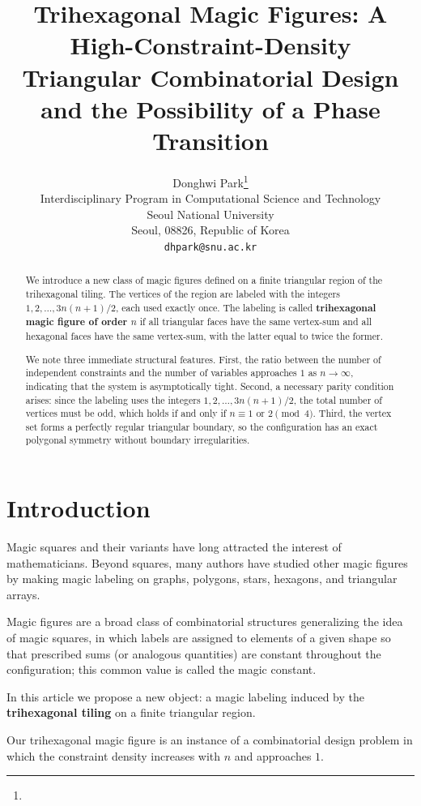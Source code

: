 \documentclass[11pt]{article}
\title{\bfseries Trihexagonal Magic Figures: A High-Constraint-Density Triangular Combinatorial Design and the Possibility of a Phase Transition}
\author{
  Donghwi Park\thanks{}\\
  Interdisciplinary Program in Computational Science and Technology\\
  Seoul National University\\
  Seoul, 08826, Republic of Korea\\
  \texttt{dhpark@snu.ac.kr}
}
\date{} %
\theoremstyle{plain}
\theoremstyle{definition}
\begin{document}
\maketitle

\begin{abstract}
We introduce a new class of magic figures defined on a finite triangular region of the trihexagonal tiling. The vertices of the region are labeled with the integers $1,2,\dots,3n(n+1)/2$, each used exactly once. The labeling is called \textbf{trihexagonal magic figure of order $n$} if all triangular faces have the same vertex-sum and all hexagonal faces have the same vertex-sum, with the latter equal to twice the former. 


We note three immediate structural features. First, the ratio between the number of independent constraints and the number of variables approaches $1$ as $n\to\infty$, indicating that the system is asymptotically tight. Second, a necessary parity condition arises: since the labeling uses the integers $1,2,\dots,3n(n+1)/2$, the total number of vertices must be odd, which holds if and only if $n \equiv 1$ or $2 \pmod{4}$. Third, the vertex set forms a perfectly regular triangular boundary, so the configuration has an exact polygonal symmetry without boundary irregularities.

\end{abstract}


\section{Introduction}

Magic squares and their variants have long attracted the interest of mathematicians. Beyond squares, many authors have studied other magic figures by making magic labeling on graphs, polygons, stars, hexagons, and triangular arrays. 

Magic figures are a broad class of combinatorial structures generalizing the idea of magic squares, in which labels are assigned to elements of a given shape so that prescribed sums (or analogous quantities) are constant throughout the configuration; this common value is called the magic constant.

In this article we propose a new object: a magic labeling induced by the \textbf{trihexagonal tiling} on a finite triangular region.

Our trihexagonal magic figure is an instance of a combinatorial design problem in which the constraint density increases with $n$ and approaches $1$.
\end{document}
